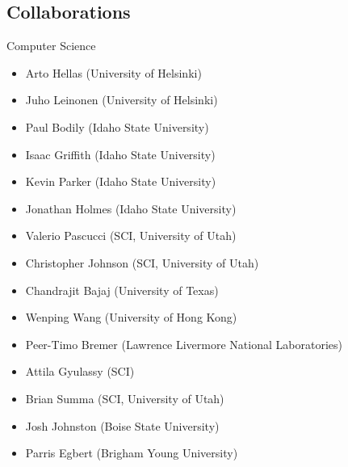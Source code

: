 \documentclass[margin,line]{res}
\begin{document}
\begin{resume}
\begin{LONG}
\section{\sc Collaborations}
Computer Science
\vspace{2mm}
\begin{itemize}[label={},leftmargin=5mm]
  \setlength\itemsep{0em}
  \item Arto Hellas (University of Helsinki)
  \item Juho Leinonen (University of Helsinki)
  \item Paul Bodily (Idaho State University)
  \item Isaac Griffith (Idaho State University)
  \item Kevin Parker (Idaho State University)
  \item Jonathan Holmes (Idaho State University)
  \item Valerio Pascucci (SCI, University of Utah)
  \item Christopher Johnson (SCI, University of Utah)
  \item Chandrajit Bajaj (University of Texas)
  \item Wenping Wang (University of Hong Kong)
  \item Peer-Timo Bremer (Lawrence Livermore National Laboratories)
  \item Attila Gyulassy (SCI)
  \item Brian Summa (SCI, University of Utah)
  \item Josh Johnston (Boise State University)
  \item Parris Egbert (Brigham Young University)
\end{itemize}


\end{LONG}
\end{resume}
\end{document}
